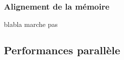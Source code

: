 \subsubsection{Alignement de la mémoire}
blabla marche pas



\subsection{Performances parallèle}











